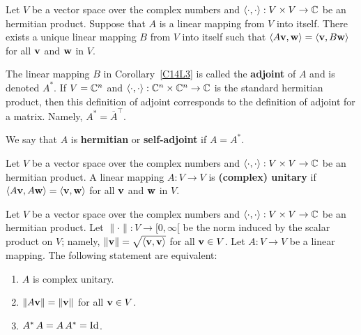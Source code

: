 \begin{cor}
Let $V$ be a vector space over the complex numbers and
$\left\langle{\cdot} , {\cdot}\right\rangle:V \times V \rightarrow \mathbb{C}$ be an hermitian product.
Suppose that $A$ is a linear mapping from $V$ into itself.  There exists a
unique linear mapping $B$ from $V$ into itself such that
$\left\langle{A\mathbf{v}} , {\mathbf{w}}\right\rangle = \left\langle{\mathbf{v}} , {B\mathbf{w}}\right\rangle$ for all $\mathbf{v}$ and
$\mathbf{w}$ in $V$.
\label{C14L3}
\end{cor}

\begin{defn}
The linear mapping $B$ in Corollary~\ref{C14L3} is called the
{\bfseries adjoint} of $A$ and is
denoted $A^\ast$.  If $V=\mathbb{C}^n$ and
$\left\langle{\cdot} , {\cdot}\right\rangle:\mathbb{C}^n \times \mathbb{C}^n \to \mathbb{C}$ is the standard
hermitian product, then this definition of adjoint
corresponds to the definition of adjoint for a matrix.
Namely, $\displaystyle A^\ast = \overline{A}^\top$.

We say that $A$ is
{\bfseries hermitian} or
{\bfseries self-adjoint} if
$A = A^\ast$.
\end{defn}

\begin{defn}
Let $V$ be a vector space over the complex numbers and
$\left\langle{\cdot} , {\cdot}\right\rangle:V \times V \rightarrow \mathbb{C}$ be an hermitian product.  A
linear mapping $A:V \rightarrow V$ is
{\bfseries (complex) unitary} if
$\left\langle{A\mathbf{v}} , {A\mathbf{w}}\right\rangle = \left\langle{\mathbf{v}} , {\mathbf{w}}\right\rangle$ for all $\mathbf{v}$ and
$\mathbf{w}$ in $V$.
\end{defn}

\begin{theorem}
Let $V$ be a vector space over the complex numbers and
$\left\langle{\cdot} , {\cdot}\right\rangle:V \times V \rightarrow \mathbb{C}$ be an hermitian product.  Let
$\|\cdot\|:V \rightarrow [0,\infty[$ be the norm induced by the scalar
product on $V$; namely, $\|\mathbf{v}\| = \sqrt{\left\langle{\mathbf{v}} , {\mathbf{v}}\right\rangle}$
for all $\mathbf{v} \in V$.  Let $A:V \rightarrow V$ be a linear mapping.
The following statement are equivalent:
\begin{enumerate}
\item $A$ is complex unitary.
\item $\| A\mathbf{v} \| =  \|\mathbf{v}\|$ for all $\mathbf{v} \in V$.
\item $A^\ast\,A = A \, A^{\ast} = \operatorname{Id}$.
\end{enumerate}
\end{theorem}

